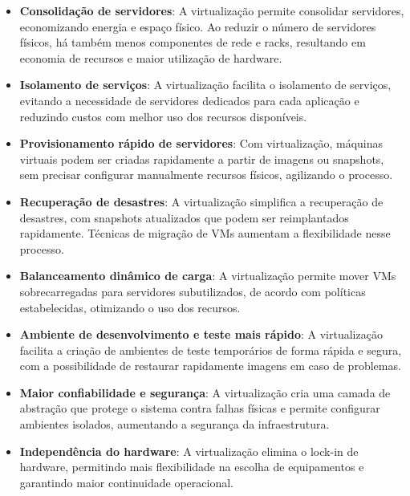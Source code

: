 \begin{itemize}
  \item \textbf{Consolidação de servidores}: A virtualização permite consolidar servidores, economizando energia e espaço físico. Ao reduzir o número de servidores físicos, há também menos componentes de rede e racks, resultando em economia de recursos e maior utilização de hardware.

  \item \textbf{Isolamento de serviços}: A virtualização facilita o isolamento de serviços, evitando a necessidade de servidores dedicados para cada aplicação e reduzindo custos com melhor uso dos recursos disponíveis.

  \item \textbf{Provisionamento rápido de servidores}: Com virtualização, máquinas virtuais podem ser criadas rapidamente a partir de imagens ou snapshots, sem precisar configurar manualmente recursos físicos, agilizando o processo.

  \item \textbf{Recuperação de desastres}: A virtualização simplifica a recuperação de desastres, com snapshots atualizados que podem ser reimplantados rapidamente. Técnicas de migração de VMs aumentam a flexibilidade nesse processo.

  \item \textbf{Balanceamento dinâmico de carga}: A virtualização permite mover VMs sobrecarregadas para servidores subutilizados, de acordo com políticas estabelecidas, otimizando o uso dos recursos.

  \item \textbf{Ambiente de desenvolvimento e teste mais rápido}: A virtualização facilita a criação de ambientes de teste temporários de forma rápida e segura, com a possibilidade de restaurar rapidamente imagens em caso de problemas.

  \item \textbf{Maior confiabilidade e segurança}: A virtualização cria uma camada de abstração que protege o sistema contra falhas físicas e permite configurar ambientes isolados, aumentando a segurança da infraestrutura.

  \item \textbf{Independência do hardware}: A virtualização elimina o lock-in de hardware, permitindo mais flexibilidade na escolha de equipamentos e garantindo maior continuidade operacional.
\end{itemize}



